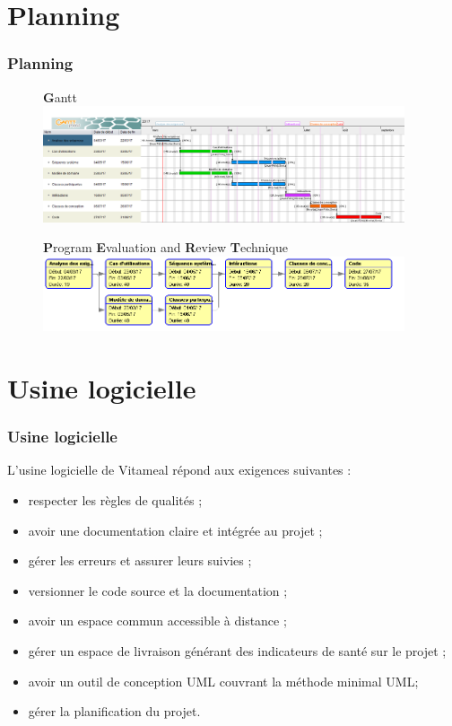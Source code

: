 \documentclass{beamer}
\begin{document}
\section{Planning}
\begin{frame}[label=planning]
\frametitle{Planning}
\begin{figure}[H]
\textbf{G}antt
\label{Gantt}
  \centering
      \includegraphics[width=0.95\textwidth]{Vitameal_gantt.png} %
\end{figure}

\begin{figure}[H]
\textbf{P}rogram \textbf{E}valuation and \textbf{R}eview \textbf{T}echnique
\label{PERT}
  \centering
      \includegraphics[width=0.95\textwidth]{Vitameal_pert.png} %
\end{figure}
\end{frame}

\section{Usine logicielle}
\begin{frame}[label=usineLogicielle]
\frametitle{Usine logicielle}
L'usine logicielle de Vitameal répond aux exigences suivantes :
\begin{itemize}
\item respecter les règles de qualités ;
\item avoir une documentation claire et intégrée au projet ;
\item gérer les erreurs et assurer leurs suivies ;
\item versionner le code source et la documentation ;
\item avoir un espace commun accessible à distance ;
\item gérer un espace de livraison générant des indicateurs de santé sur le projet ;
\item avoir un outil de conception UML couvrant la méthode minimal UML;
\item gérer la planification du projet.
\end{itemize}
\end{frame}
\end{document}
